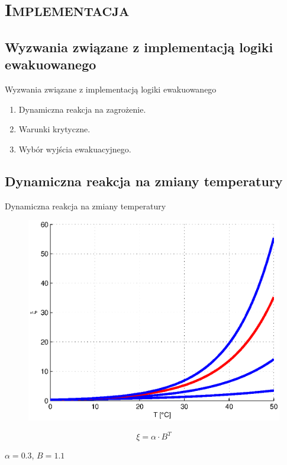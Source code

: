 \section{\scshape Implementacja}


\subsection{Wyzwania związane z implementacją logiki ewakuowanego}
\begin{frame}{Wyzwania związane z implementacją logiki ewakuowanego}
  \begin{enumerate}
    \item Dynamiczna reakcja na zagrożenie.
    \item Warunki krytyczne.
    \item Wybór wyjścia ewakuacyjnego.
  \end{enumerate}
\end{frame}


\subsection{Dynamiczna reakcja na zmiany temperatury}
\begin{frame}{Dynamiczna reakcja na zmiany temperatury}
  \begin{figure}
    \centering
    \includegraphics[height=0.6\textheight]{wykresy-kuba}
  \end{figure}
  \begin{center}
  $$\xi = \alpha \cdot B^T$$
  \end{center}
  \begin{center}
  $\alpha = 0.3$, $B = 1.1$
  \end{center}
\end{frame}


